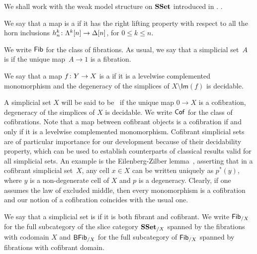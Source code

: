 \documentclass[reqno,10pt,a4paper,oneside,draft]{amsart}
\begin{document}
\medskip



\bigskip


We shall work  with the weak model structure on $\mathbf{SSet}$ introduced  in \cite[Section~5]{henry2018wms}. . 


\begin{definition}  We say that a map is a  if it has the right lifting property with respect to all the horn inclusions $h^k_n  \colon \Lambda^k[n] \to \Delta[n]$, for $0 \leq k \leq n$. 
\end{definition}

We write $\mathsf{Fib}$ for the class of fibrations. As usual, we say that a simplicial set~$A$ is  if 
 \ie the unique map~$A \to 1$ is a fibration.


\begin{definition} We say that  a map $f \colon Y \to X$ is a  if 
it is a levelwise complemented monomorphism and the degeneracy of the simplices of $X \setminus \mathsf{Im}(f)$ is decidable. 
\end{definition}



A simplicial set $X$ will be said to be~ if the unique map $0 \to X$ is a cofibration, 
\ie degeneracy of the simplices of $X$ is decidable.
We write $\mathsf{Cof}$ for the class of cofibrations.  Note that a map between cofibrant objects is a cofibration
if and only if it is a levelwise complemented monomorphism. 
Cofibrant simplicial sets are of particular importance for our development because of their decidability property, which can be used to establish counterparts of classical results valid for all simplicial sets. An example is the Eilenberg-Zilber lemma~\cite{henry2018wms}, asserting that in a cofibrant simplicial set~$X$, any cell $x \in X$ can be written uniquely as $p^*(y)$, where $y$ is a non-degenerate cell of $X$ and $p$ is a degeneracy. Clearly, if one assumes the law of excluded middle, then every monomorphism is a cofibration and our notion of a cofibration coincides with the usual one. 


\medskip


We say that a simplicial set is  if it is both fibrant and cofibrant.  We write $\mathsf{Fib}_{/X}$ for the full subcategory of the slice category $\mathbf{SSet}_{/X}$ spanned by the fibrations with codomain $X$
and $\mathsf{BFib}_{/X}$ for  the full subcategory of  $\mathsf{Fib}_{/X}$ spanned by fibrations with cofibrant domain.
\end{document}
